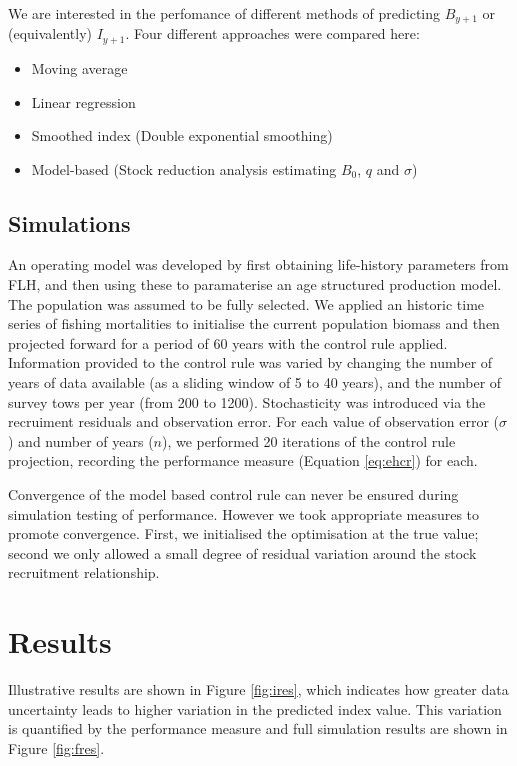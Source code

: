 \documentclass[11pt]{article} %
\begin{document}
We are interested in the perfomance of different methods of predicting $B_{y+1}$ or (equivalently) $I_{y+1}$. Four different approaches were compared here:
\begin{itemize}
\item Moving average
\item Linear regression
\item Smoothed index (Double exponential smoothing)
\item Model-based (Stock reduction analysis estimating $B_0$, $q$ and $\sigma$)
\end{itemize}


\subsection{Simulations}

An operating model was developed by first obtaining life-history parameters from FLH, and then using these to paramaterise an age structured production model. The population was assumed to be fully selected. We applied an historic time series of fishing mortalities to initialise the current population biomass and then projected forward for a period of 60 years with the control rule applied. Information provided to the control rule was varied by changing the number of years of data available (as a sliding window of 5 to 40 years), and the number of survey tows per year (from 200 to 1200). Stochasticity was introduced via the recruiment residuals and observation error. For each value of observation error ($\sigma$) and number of years ($n$), we performed 20 iterations of the control rule projection, recording the performance measure (Equation \ref{eq:ehcr}) for each.

Convergence of the model based control rule can never be ensured during simulation testing of performance. However we took appropriate measures to promote convergence. First, we initialised the optimisation at the true value; second we only allowed a small degree of residual variation around the stock recruitment relationship.

\section{Results}

Illustrative results are shown in Figure \ref{fig:ires}, which indicates how greater data uncertainty leads to higher variation in the predicted index value. This variation is quantified by the performance measure and full simulation results are shown in Figure \ref{fig:fres}.
\end{document}
